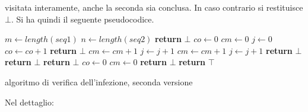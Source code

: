 \documentclass[a4paper,12pt, oneside]{book}
\begin{document}
visitata interamente, anche la seconda sia conclusa. In caso contrario si
restituisce $\bot$.
\newpage
Si ha quindi il seguente pseudocodice.
\begin{algorithm}[H]
  \small
  \begin{algorithmic}[1]
    \State $m \gets length(seq1)$
    \State $n \gets length(seq2)$
    \State \textbf{return} $\bot$
    \EndIf
    \State $co \gets 0$
    \State $cm \gets 0$
    \State $j \gets 0$
    \State $co \gets co+1$
    \State \textbf{return} $\bot$
    \EndIf
    \State $cm \gets cm+1$
    \State $j \gets j+1$
    \EndWhile
    \State $cm \gets cm+1$
    \State $j \gets j+1$
    \State \textbf{return} $\bot$
    \State \textbf{return} $\bot$
    \State \textbf{return} $\bot$
    \EndIf
    \State $co \gets 0$
    \State $cm \gets 0$
    \State  \textbf{return} $\bot$
    \EndIf
    \EndIf
    \EndFor
    \State \textbf{return} $\top$
    \EndFunction
  \end{algorithmic}
  \caption{algoritmo di verifica dell'infezione, seconda versione}
\end{algorithm}
\newpage
Nel dettaglio:
\end{document}
